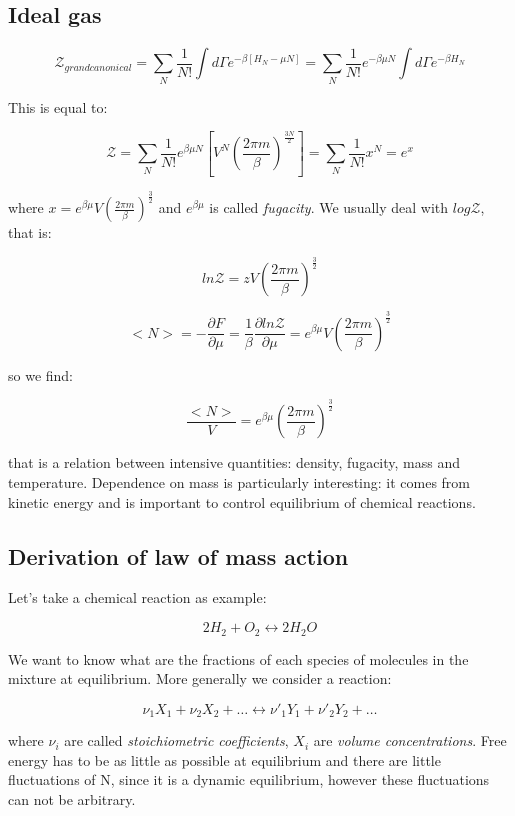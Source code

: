 \documentclass[a4paper, italian, openany]{book}
\begin{document}
\subsection{Ideal gas}

$$\mathcal{Z}_{grand canonical} = \sum_N \frac{1}{N!} \int d\Gamma e^{-\beta\left [ H_N - \mu N \right ]} = \sum_N \frac{1}{N!} e^{-\beta \mu N} \int d\Gamma e^{-\beta H_N}$$

This is equal to:

$$\mathcal{Z} = \sum_N \frac{1}{N!} e^{\beta \mu N} \left [ V^N \left ( \frac{2\pi m}{\beta} \right )^{\frac{3N}{2}} \right ] = \sum_N \frac{1}{N!} x^N = e^x$$

where $x = e^{\beta \mu} V \left ( \frac{2\pi m}{\beta} \right )^{\frac{3}{2}}$ and $e^{\beta \mu}$ is called \textit{fugacity}.\newline
We usually deal with $log\mathcal{Z}$, that is:

$$ln \mathcal{Z} = z V \left ( \frac{2\pi m}{\beta} \right )^{\frac{3}{2}}$$

$$<N> = - \frac{\partial F}{\partial \mu} = \frac{1}{\beta} \frac{\partial ln \mathcal{Z}}{\partial \mu} = e^{\beta \mu} V \left ( \frac{2\pi m}{\beta} \right )^{\frac{3}{2}}$$

so we find:

$$\frac{<N>}{V} = e^{\beta \mu} \left ( \frac{2 \pi m}{\beta}\right )^{\frac{3}{2}}$$

that is a relation between intensive quantities: density, fugacity, mass and temperature. Dependence on mass is particularly interesting: it comes from kinetic energy and is important to control equilibrium of chemical reactions.

\subsection{Derivation of law of mass action}

Let's take a chemical reaction as example:

$$2 H_2 + O_2 \leftrightarrow 2H_2 O$$

We want to know what are the fractions of each species of molecules in the mixture at equilibrium. More generally we consider a reaction:

$$ \nu_1 X_1 + \nu_2 X_2 + \ldots \leftrightarrow \nu'_1 Y_1 + \nu'_2 Y_2 + \ldots$$

where $\nu_i$ are called \textit{stoichiometric coefficients}, $X_i$ are \textit{volume concentrations}.\newline
Free energy has to be as little as possible at equilibrium and there are little fluctuations of N, since it is a dynamic equilibrium, however these fluctuations can not be arbitrary.
\end{document}
